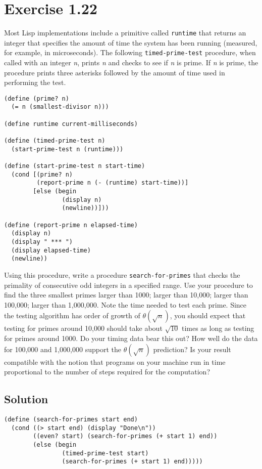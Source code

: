 \documentclass[11pt]{article}
\begin{document}
\section{Exercise 1.22}
\label{sec:orgd75cc28}
Most Lisp implementations include a primitive called \texttt{runtime} that returns an
integer that specifies the amount of time the system has been running
(measured, for example, in microseconds). The following \texttt{timed-prime-test}
procedure, when called with an integer \emph{n}, prints \emph{n} and checks to see if
\emph{n} is prime. If \emph{n} is prime, the procedure prints three asterisks followed
by the amount of time used in performing the test.
\begin{verbatim}
(define (prime? n)
  (= n (smallest-divisor n)))

(define runtime current-milliseconds)

(define (timed-prime-test n)
  (start-prime-test n (runtime)))

(define (start-prime-test n start-time)
  (cond [(prime? n)
         (report-prime n (- (runtime) start-time))]
        [else (begin
                (display n)
                (newline))]))

(define (report-prime n elapsed-time)
  (display n)
  (display " *** ")
  (display elapsed-time)
  (newline))
\end{verbatim}
Using this procedure, write a procedure \texttt{search-for-primes} that checks the
primality of consecutive odd integers in a specified range. Use your procedure
to find the three smallest primes larger than 1000; larger than 10,000; larger
than 100,000; larger than 1,000,000. Note the time needed to test each
prime. Since the testing algorithm has order of growth of \(\theta(\sqrt{n})\), you should expect that testing for primes around 10,000 should take about
\(\sqrt{10}\) times as long as testing for primes around 1000. Do your
timing data bear this out? How well do the data for 100,000 and 1,000,000
support the \(\theta(\sqrt{n})\) prediction? Is your result compatible with
the notion that programs on your machine run in time proportional to the
number of steps required for the computation?
\subsection{Solution}
\label{sec:org43a29e7}
\begin{verbatim}
(define (search-for-primes start end)
  (cond ((> start end) (display "Done\n"))
        ((even? start) (search-for-primes (+ start 1) end))
        (else (begin
                (timed-prime-test start)
                (search-for-primes (+ start 1) end)))))
\end{verbatim}
\end{document}
